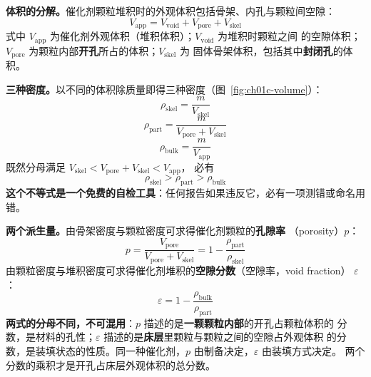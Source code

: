 \begin{principle}
\textbf{体积的分解。}催化剂颗粒堆积时的外观体积包括骨架、内孔与颗粒间空隙：
\begin{equation}\label{eq:ch01c-volapp}
V_{\mathrm{app}}=V_{\mathrm{void}}+V_{\mathrm{pore}}+V_{\mathrm{skel}}
\end{equation}
式中 $V_{\mathrm{app}}$ 为催化剂外观体积（堆积体积）；$V_{\mathrm{void}}$ 为堆积时颗粒之间
的空隙体积；$V_{\mathrm{pore}}$ 为颗粒内部\textbf{开孔}所占的体积；$V_{\mathrm{skel}}$ 为
固体骨架体积，包括其中\textbf{封闭孔}的体积。

\textbf{三种密度。}以不同的体积除质量即得三种密度（图~\ref{fig:ch01c-volume}）：
\begin{equation}\label{eq:ch01c-rhoskel}
\rho_{\mathrm{skel}}=\frac{m}{V_{\mathrm{skel}}}
\end{equation}
\begin{equation}\label{eq:ch01c-rhopart}
\rho_{\mathrm{part}}=\frac{m}{V_{\mathrm{pore}}+V_{\mathrm{skel}}}
\end{equation}
\begin{equation}\label{eq:ch01c-rhobulk}
\rho_{\mathrm{bulk}}=\frac{m}{V_{\mathrm{app}}}
\end{equation}
既然分母满足 $V_{\mathrm{skel}}<V_{\mathrm{pore}}+V_{\mathrm{skel}}<V_{\mathrm{app}}$，
必有
\begin{equation}\label{eq:ch01c-order}
\rho_{\mathrm{skel}}>\rho_{\mathrm{part}}>\rho_{\mathrm{bulk}}
\end{equation}
\textbf{这个不等式是一个免费的自检工具}：任何报告如果违反它，必有一项测错或命名用错。

\textbf{两个派生量。}由骨架密度与颗粒密度可求得催化剂颗粒的\textbf{孔隙率}
（porosity）$p$：
\begin{equation}\label{eq:ch01c-poros}
p=\frac{V_{\mathrm{pore}}}{V_{\mathrm{pore}}+V_{\mathrm{skel}}}
 =1-\frac{\rho_{\mathrm{part}}}{\rho_{\mathrm{skel}}}
\end{equation}
由颗粒密度与堆积密度可求得催化剂堆积的\textbf{空隙分数}（空隙率，void fraction）
$\varepsilon$：
\begin{equation}\label{eq:ch01c-voidfrac}
\varepsilon=1-\frac{\rho_{\mathrm{bulk}}}{\rho_{\mathrm{part}}}
\end{equation}
\textbf{两式的分母不同，不可混用}：$p$ 描述的是\textbf{一颗颗粒内部}的开孔占颗粒体积的
分数，是材料的孔性；$\varepsilon$ 描述的是\textbf{床层}里颗粒与颗粒之间的空隙占外观体积
的分数，是装填状态的性质。同一种催化剂，$p$ 由制备决定，$\varepsilon$ 由装填方式决定。
两个分数的乘积才是开孔占床层外观体积的总分数。


\end{principle}
